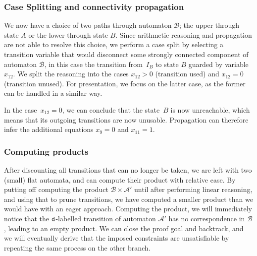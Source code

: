 
\subsubsection{Case Splitting and connectivity propagation}\label{sec:intuition:split}
We now have a choice of two paths through automaton $\mathcal{B}$; the
upper through state $A$ or the lower through state $B$. Since
arithmetic reasoning and propagation are not able to resolve this choice,
we perform a case split by selecting a transition variable that would disconnect
some strongly connected component of automaton $\mathcal{B}$, in this case the transition
from~$I_B$ to state $B$ guarded by variable~$x_{12}$.
 We split the reasoning into the cases $x_{12} > 0$ (transition used)
and $x_{12} = 0$ (transition unused). For presentation, we focus
on the latter case, as the former can be handled in a similar way.

In the case~$x_{12} = 0$, we can conclude
that the state~$B$ is now unreachable, which means that its outgoing transitions are now unusable. Propagation can
therefore infer the additional equations $x_9 = 0$ and $x_{11} = 1$.


\subsubsection{Computing products}\label{sec:intuition:materialise}
After discounting all transitions that can no longer be taken, we are
left with two (small) flat automata, and can compute their product with
relative ease. By putting off computing the product $\mathcal{B} \times \mathcal{A}'$ until after
performing linear reasoning, and using that to prune transitions, we
have computed a smaller product than we would have with an eager
approach. Computing the product, we will immediately notice that the
$\texttt{d}$-labelled transition of automaton $\mathcal{A}'$ has no correspondence
in $\mathcal{B}$, leading to an empty product. We can close the proof goal and
backtrack, and we will eventually derive that the imposed constraints are
unsatisfiable by repeating the same process on the other branch.

